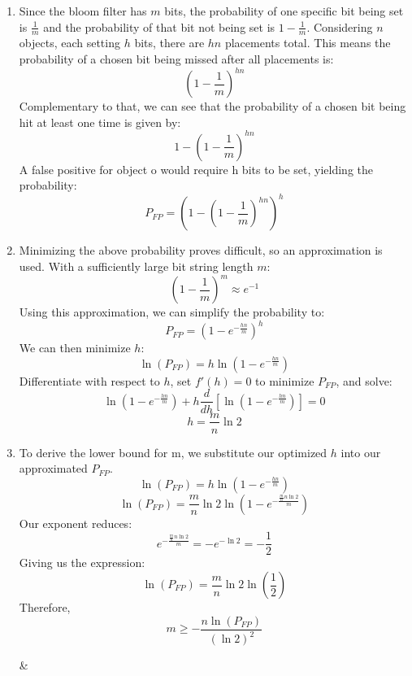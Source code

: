 \documentclass{article}
\begin{document}
\begin{enumerate}[label=\alph*)]
    \item Since the bloom filter has $m$ bits, the probability of one specific bit being set is $\frac{1}{m}$ and the probability of that bit not being set is $1-\frac{1}{m}$. Considering $n$ objects, each setting $h$ bits, there are $hn$ placements total. This means the probability of a chosen bit being missed after all placements is:
    $$(1-\frac{1}{m})^{hn}$$
    Complementary to that, we can see that the probability of a chosen bit being hit at least one time is given by:
    $$1-(1-\frac{1}{m})^{hn}$$
    A false positive for object o would require h bits to be set, yielding the probability:
    $$P_{FP} = (1-(1-\frac{1}{m})^{hn})^h$$
    \item 
    Minimizing the above probability proves difficult, so an approximation is used. With a sufficiently large bit string length $m$:
    $$(1-\frac{1}{m})^m \approx e^{-1}$$
    Using this approximation, we can simplify the probability to:
    $$P_{FP} = (1-e^{-\frac{hn}{m}})^h$$
    We can then minimize $h$:
    $$\ln(P_{FP}) = h\ln(1-e^{-\frac{hn}{m}})$$
    Differentiate with respect to $h$, set $f'(h)=0$ to minimize $P_{FP}$, and solve:
    $$\ln(1-e^{-\frac{hn}{m}}) + h\frac{d}{dh}[\ln(1-e^{-\frac{hn}{m}})] = 0$$
    $$h = \frac{m}{n}\ln 2$$
    \item 
    To derive the lower bound for m, we substitute our optimized $h$ into our approximated $P_{FP}$.
    $$\ln(P_{FP}) = h\ln(1-e^{-\frac{hn}{m}})$$
    $$\ln(P_{FP}) = \frac{m}{n}\ln 2\ln(1-e^{-\frac{\frac{m}{n}n\ln 2}{m}})$$
    Our exponent reduces:
    $$e^{-\frac{\frac{m}{n}n\ln 2}{m}}=-e^{-\ln2}=-\frac{1}{2}$$
    Giving us the expression:
    $$\ln(P_{FP}) = \frac{m}{n}\ln 2 \ln(\frac{1}{2})$$
    Therefore, $$m \geq -\frac{n\ln(P_{FP})}{(\ln2)^2}$$
    \begin{center}
        {\csvcoli & \csvcolii}
    \end{center}


\end{enumerate}
\end{document}
